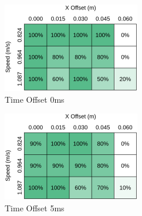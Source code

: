 \begin{figure}[ht]
    \centering
    \begin{subfigure}{.3\linewidth}
        \centering
        \includegraphics[width=\textwidth]{Images/VisionResults0.png}
        \caption{Time Offset 0ms}
        \label{subfigure:TimeOffset0ms}
    \end{subfigure}
    \begin{subfigure}{.3\linewidth}
        \centering
    \includegraphics[width=\textwidth]{Images/VisionResults5.png}
        \caption{Time Offset 5ms}
        \label{subfigure:TimeOffset5ms}
    \end{subfigure}
    \begin{subfigure}{.3\linewidth}
        \centering

\end{subfigure}
\end{figure}
